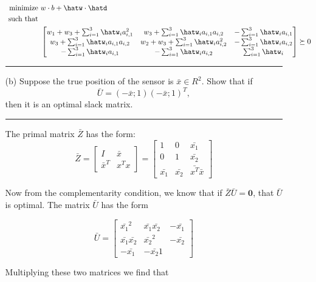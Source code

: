 \documentclass{article} %
\newcommand{\h}[1]{\expandafter\hat#1}
\newcommand{\B}[1]{\mathbf#1}
\begin{document}
\begin{enumerate}
\begin{itemize}
\begin{equation*}
\begin{aligned}
\mbox{ minimize } & w \cdot b + \h{w} \cdot \h{d} \\ 
\mbox{ such that } & \\ 
& \begin{bmatrix} w_1 + w_3 + \sum_{i =1}^3 \h{w_i} a_{i,1}^2 &  w_3 +  \sum_{i =1}^3 \h{w_i} a_{i,1} a_{i,2} & - \sum_{i=1}^3 \h{w_i}a_{i,1}  \\   w_3 + \sum_{i =1}^3  \h{w_i} a_{i,1} a_{i,2} & w_2 + w_3 + \sum_{i=1}^3 \h{w_i} a_{i,2}^2 & - \sum_{i=1}^{3} \h{w_i} a_{i,2} \\ - \sum_{i=1}^{3} \h{w_i} a_{i,1} & - \sum_{i=1}^{3} \h{w_i} a_{i,2}   & \sum_{i=1}^3 \h{w_i} \end{bmatrix} \succeq 0 
\end{aligned}
\end{equation*}




\rule{\textwidth}{1pt}

\item[(b)] Suppose the true position of the sensor is $\bar{x}\in R^2$. Show that if 
\[\bar{U}=(-\bar{x};1)(-\bar{x};1)^T,\]
then it is an optimal slack matrix.


\rule{\textwidth}{1pt}

The primal matrix $\bar{Z}$ has the form: 
\[ \bar{Z} = \begin{bmatrix} I & \bar{x} \\ \bar{x}^T & x^T x \end{bmatrix} = \begin{bmatrix} 1 & 0 &  \bar{x_1} \\  0 & 1 & \bar{x_2} \\ \bar{x_1} & \bar{x_2} & \bar{x^T} \bar{x} \end{bmatrix} \]

Now from the complementarity condition, we know that if $\bar{Z} \bar{U} = \B{0}$, that $\bar{U}$ is optimal. The matrix $\bar{U}$ has the form 

\[
\bar{U} = \begin{bmatrix} \bar{x_1}^2 & \bar{x_1} \bar{x_2} & -\bar{x_1} \\ \bar{x_1} \bar{x_2} & \bar{x_2}^2 & - \bar{x_2} \\ - \bar{x_1} & - \bar{x_2} 1 \end{bmatrix}
\]

Multiplying these two matrices we find that 


\end{itemize}
\end{enumerate}
\end{document}
